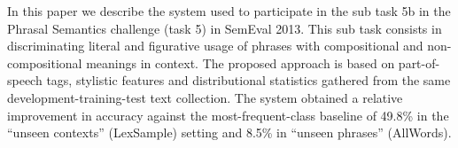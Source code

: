 In this paper we describe the system used to participate in the sub task 5b in the Phrasal Semantics challenge (task 5) in SemEval 2013. This sub task
 consists in discriminating literal and figurative usage of phrases with
 compositional and non-compositional meanings in context. The proposed approach
 is based on part-of-speech tags, stylistic features and distributional
 statistics gathered from the same development-training-test text collection.
 The system obtained a relative improvement in accuracy against the
 most-frequent-class baseline of 49.8\% in the ``unseen contexts'' (LexSample)
 setting and 8.5\% in ``unseen phrases'' (AllWords).

